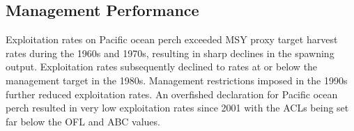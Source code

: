 \documentclass[12pt,]{article}
\begin{document}
\FloatBarrier

\subsection*{Management Performance}\label{management-performance}

Exploitation rates on Pacific ocean perch exceeded MSY proxy target
harvest rates during the 1960s and 1970s, resulting in sharp declines in
the spawning output. Exploitation rates subsequently declined to rates
at or below the management target in the 1980s. Management restrictions
imposed in the 1990s further reduced exploitation rates. An overfished
declaration for Pacific ocean perch resulted in very low exploitation
rates since 2001 with the ACLs being set far below the OFL and ABC
values.

\begin{table}[ht]
\centering
\caption{Recent trend in total catch and commercial 
                              landings (mt) relative to the management guidelines. 
                              Estimated total catch reflect the commercial landings 
                              plus the model estimated discarded biomass.} 
\label{tab:mnmgt_perform}
\end{table}
\end{document}
